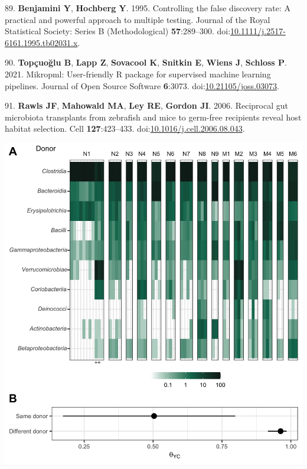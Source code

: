 \documentclass[
  12pt,
]{article}
\newenvironment{cslreferences}%
  {}%
  {\par}
\begin{document}
\begin{cslreferences}
\leavevmode\hypertarget{ref-Benjamini1995}{}%
89. \textbf{Benjamini Y}, \textbf{Hochberg Y}. 1995. Controlling the
false discovery rate: A practical and powerful approach to multiple
testing. Journal of the Royal Statistical Society: Series B
(Methodological) \textbf{57}:289--300.
doi:\href{https://doi.org/10.1111/j.2517-6161.1995.tb02031.x}{10.1111/j.2517-6161.1995.tb02031.x}.

\leavevmode\hypertarget{ref-Topcuoglu2021}{}%
90. \textbf{Topçuoğlu B}, \textbf{Lapp Z}, \textbf{Sovacool K},
\textbf{Snitkin E}, \textbf{Wiens J}, \textbf{Schloss P}. 2021.
Mikropml: User-friendly R package for supervised machine learning
pipelines. Journal of Open Source Software \textbf{6}:3073.
doi:\href{https://doi.org/10.21105/joss.03073}{10.21105/joss.03073}.

\leavevmode\hypertarget{ref-Rawls2006}{}%
91. \textbf{Rawls JF}, \textbf{Mahowald MA}, \textbf{Ley RE},
\textbf{Gordon JI}. 2006. Reciprocal gut microbiota transplants from
zebrafish and mice to germ-free recipients reveal host habitat
selection. Cell \textbf{127}:423--433.
doi:\href{https://doi.org/10.1016/j.cell.2006.08.043}{10.1016/j.cell.2006.08.043}.
\end{cslreferences}

\newpage

\includegraphics{../results/figures/figure_1.jpg}
\end{document}
